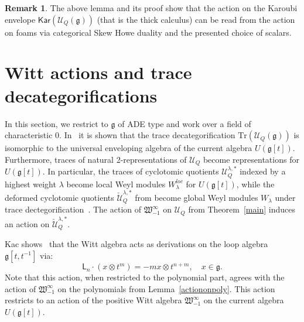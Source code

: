 \documentclass{amsart}
\numberwithin{equation}{section}
\theoremstyle{definition}
\newtheorem{remark}[thm]{Remark}
\def\mf{\mathfrak}
\newcommand{\Ucat}{\mathcal{U}_Q}
\newcommand{\witt}{{\mathfrak{W}}}
\newcommand{\LLn}[1][n]{{\mathsf{L}_{#1}}}
\newcommand{\ourwitt}{{\witt_{-1}^{\infty}}}
\begin{document}
\begin{remark}
    The above lemma and its proof show that the action on the Karoubi envelope $\mathsf{Kar}({\Ucat(\mathfrak{g})})$ (that is the thick calculus) can be read from the action on foams via categorical Skew Howe duality and the presented choice of scalars.
\end{remark}








\section{Witt actions and trace decategorifications}
In this section, we restrict to $\mathfrak{g}$ of ADE type and work over a field of characteristic $0$.  
In~\cite{Beliakova_2016,Lau-trace3} it is shown that the trace decategorification $\mathrm{Tr}(\Ucat(\mathfrak{g}))$ is isomorphic to the universal enveloping algebra of the current algebra $U(\mathfrak{g}[t])$.  Furthermore, traces of  natural 2-representations of $\Ucat$ become representations for $U(\mathfrak{g}[t])$.  In particular, the traces of cyclotomic quotients $\mathcal{U}_Q^{\lambda,\ast}$ indexed by a highest weight $\lambda$ become local Weyl modules $W_\lambda^{loc}$ for $U(\mathfrak{g}[t])$, while the deformed cyclotomic quotients $\check{\mathcal{U}}_Q^{\lambda,\ast}$ from \cite{RouQH,Webster_2017} become global Weyl modules $W_{\lambda}$ under trace dectegorification~\cite[Theorem A.]{Lau-trace3}. 
%
%
The action of $\ourwitt$ on $\Ucat$ from Theorem~\ref{main} induces an action on $\check{\mathcal{U}}_Q^{\lambda,\ast}$.     

 

 



Kac shows~\cite{kac1990infinite} that the Witt algebra acts as derivations on the loop algebra $\mf{g}[t,t^{-1}]$ via:
\begin{equation} \label{Witt-Kac}
   \LLn \cdot (x \otimes t^m) = - mx \otimes t^{n+m}, \quad x \in \mf{g}. 
\end{equation} 
Note that this action, when restricted to the polynomial part, agrees with the action of $\ourwitt$ on the polynomials from Lemma~\ref{actiononpoly}.
This action restricts to an action of the positive Witt algebra $\ourwitt$ on the current algebra $U(\mathfrak{g}[t])$.      
\end{document}
